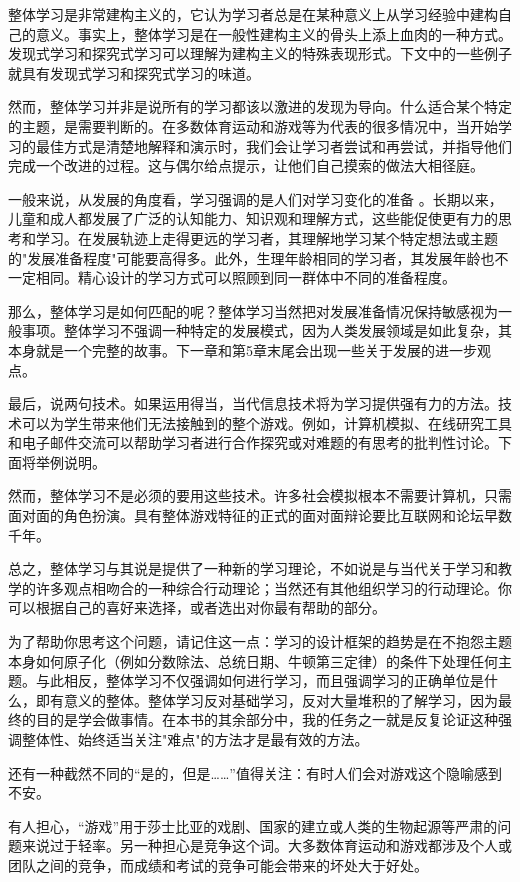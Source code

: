 整体学习是非常建构主义的，它认为学习者总是在某种意义上从学习经验中建构自己的意义。事实上，整体学习是在一般性建构主义的骨头上添上血肉的一种方式。发现式学习和探究式学习可以理解为建构主义的特殊表现形式。下文中的一些例子就具有发现式学习和探究式学习的味道。

然而，整体学习并非是说所有的学习都该以激进的发现为导向。什么适合某个特定的主题，是需要判断的。在多数体育运动和游戏等为代表的很多情况中，当开始学习的最佳方式是清楚地解释和演示时，我们会让学习者尝试和再尝试，并指导他们完成一个改进的过程。这与偶尔给点提示，让他们自己摸索的做法大相径庭。

一般来说，从发展的角度看，学习强调的是人们对学习变化的准备 。长期以来，儿童和成人都发展了广泛的认知能力、知识观和理解方式，这些能促使更有力的思考和学习。在发展轨迹上走得更远的学习者，其理解地学习某个特定想法或主题的"发展准备程度"可能要高得多。此外，生理年龄相同的学习者，其发展年龄也不一定相同。精心设计的学习方式可以照顾到同一群体中不同的准备程度。

那么，整体学习是如何匹配的呢？整体学习当然把对发展准备情况保持敏感视为一般事项。整体学习不强调一种特定的发展模式，因为人类发展领域是如此复杂，其本身就是一个完整的故事。下一章和第5章末尾会出现一些关于发展的进一步观点。

最后，说两句技术。如果运用得当，当代信息技术将为学习提供强有力的方法。技术可以为学生带来他们无法接触到的整个游戏。例如，计算机模拟、在线研究工具和电子邮件交流可以帮助学习者进行合作探究或对难题的有思考的批判性讨论。下面将举例说明。

然而，整体学习不是必须的要用这些技术。许多社会模拟根本不需要计算机，只需面对面的角色扮演。具有整体游戏特征的正式的面对面辩论要比互联网和论坛早数千年。

总之，整体学习与其说是提供了一种新的学习理论，不如说是与当代关于学习和教学的许多观点相吻合的一种综合行动理论；当然还有其他组织学习的行动理论。你可以根据自己的喜好来选择，或者选出对你最有帮助的部分。

为了帮助你思考这个问题，请记住这一点：学习的设计框架的趋势是在不抱怨主题本身如何原子化（例如分数除法、总统日期、牛顿第三定律）的条件下处理任何主题。与此相反，整体学习不仅强调如何进行学习，而且强调学习的正确单位是什么，即有意义的整体。整体学习反对基础学习，反对大量堆积的了解学习，因为最终的目的是学会做事情。在本书的其余部分中，我的任务之一就是反复论证这种强调整体性、始终适当关注"难点"的方法才是最有效的方法。

还有一种截然不同的“是的，但是……”值得关注：有时人们会对游戏这个隐喻感到不安。

有人担心，“游戏”用于莎士比亚的戏剧、国家的建立或人类的生物起源等严肃的问题来说过于轻率。另一种担心是竞争这个词。大多数体育运动和游戏都涉及个人或团队之间的竞争，而成绩和考试的竞争可能会带来的坏处大于好处。

